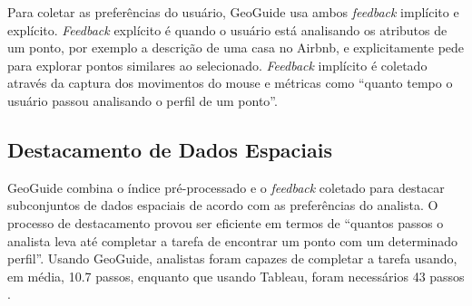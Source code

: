 Para coletar as preferências do usuário, GeoGuide usa ambos {\em feedback} implícito e explícito. {\em Feedback} explícito é quando o usuário está analisando os atributos de um ponto, por exemplo a descrição de uma casa no Airbnb, e explicitamente pede para explorar pontos similares ao selecionado. {\em Feedback} implícito é coletado através da captura dos movimentos do mouse e métricas como  ``quanto tempo o usuário passou analisando o perfil de um ponto''.

\subsection{Destacamento de Dados Espaciais}

GeoGuide combina o índice pré-processado e o {\em feedback} coletado para destacar subconjuntos de dados espaciais de acordo com as preferências do analista. O processo de destacamento provou ser eficiente em termos de ``quantos passos o analista leva até completar a tarefa de encontrar um ponto com um determinado perfil''. Usando GeoGuide, analistas foram capazes de completar a tarefa usando, em média, 10.7 passos, enquanto que usando Tableau, foram necessários 43 passos \cite{omidvarTehrani2017}.


